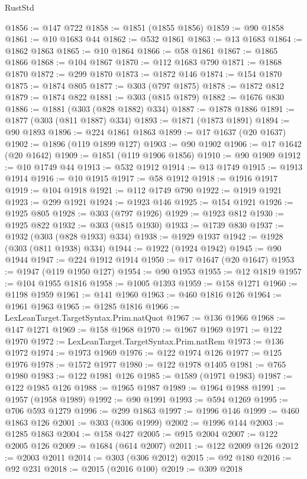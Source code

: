 \begin{lexlean}{RustStd}
\begin{coremodule}
{\begin{coremodule}
{{{{{{{{{{{{{{{{{{{{{{{{{{{{{{{{{{{{{{{{{{{{{{{{{{{{{{{{{{{{{{{{{{{{@1856 := @147 @722
@1858 := @1851 (@1855 @1856)
@1859 := @90 @1858
@1861 := @10 @1683 @44
@1862 := @532 @1861
@1863 := @13 @1683
@1864 := @1862 @1863
@1865 := @10 @1864
@1866 := @58 @1861
@1867 := @1865 @1866
@1868 := @104 @1867
@1870 := @112 @1683 @790
@1871 := @1868 @1870
@1872 := @299 @1870
@1873 := @1872 @146
@1874 := @154 @1870
@1875 := @1874 @805
@1877 := @303 (@797 @1875)
@1878 := @1872 @812
@1879 := @1874 @822
@1881 := @303 (@815 @1879)
@1882 := @1676 @830
@1886 := @1881 (@303 (@828 @1882) @334)
@1887 := @1878 @1886
@1891 := @1877 (@303 (@811 @1887) @334)
@1893 := @1871 (@1873 @1891)
@1894 := @90 @1893
@1896 := @224 @1861 @1863
@1899 := @17 @1637 (@20 @1637)
@1902 := @1896 (@119 @1899 @127)
@1903 := @90 @1902
@1906 := @17 @1642 (@20 @1642)
@1909 := @1851 (@119 @1906 @1856)
@1910 := @90 @1909
@1912 := @10 @1749 @44
@1913 := @532 @1912
@1914 := @13 @1749
@1915 := @1913 @1914
@1916 := @10 @1915
@1917 := @58 @1912
@1918 := @1916 @1917
@1919 := @104 @1918
@1921 := @112 @1749 @790
@1922 := @1919 @1921
@1923 := @299 @1921
@1924 := @1923 @146
@1925 := @154 @1921
@1926 := @1925 @805
@1928 := @303 (@797 @1926)
@1929 := @1923 @812
@1930 := @1925 @822
@1932 := @303 (@815 @1930)
@1933 := @1739 @830
@1937 := @1932 (@303 (@828 @1933) @334)
@1938 := @1929 @1937
@1942 := @1928 (@303 (@811 @1938) @334)
@1944 := @1922 (@1924 @1942)
@1945 := @90 @1944
@1947 := @224 @1912 @1914
@1950 := @17 @1647 (@20 @1647)
@1953 := @1947 (@119 @1950 @127)
@1954 := @90 @1953
@1955 := @12 @1819
@1957 := @104 @1955 @1816
@1958 := @1005 @1393
@1959 := @158 @1271
@1960 := @1198 @1959
@1961 := @141 @1960
@1963 := @460 @1816 @126
@1964 := @1961 @1963
@1965 := @1285 @1816
@1966 := LexLeanTarget.TargetSyntax.Prim.natQuot
@1967 := @136 @1966
@1968 := @147 @1271
@1969 := @158 @1968
@1970 := @1967 @1969
@1971 := @122 @1970
@1972 := LexLeanTarget.TargetSyntax.Prim.natRem
@1973 := @136 @1972
@1974 := @1973 @1969
@1976 := @122 @1974 @126
@1977 := @125 @1976
@1978 := @1572 @1977
@1980 := @122 @1978 @1405
@1981 := @765 @1980
@1983 := @122 @1981 @126
@1985 := @1589 (@1971 @1983)
@1987 := @122 @1985 @126
@1988 := @1965 @1987
@1989 := @1964 @1988
@1991 := @1957 (@1958 @1989)
@1992 := @90 @1991
@1993 := @594 @1269
@1995 := @706 @593 @1279
@1996 := @299 @1863
@1997 := @1996 @146
@1999 := @460 @1863 @126
@2001 := @303 (@306 @1999)
@2002 := @1996 @144
@2003 := @1285 @1863
@2004 := @158 @427
@2005 := @915 @2004
@2007 := @122 @2005 @126
@2009 := @1684 (@614 @2007)
@2011 := @122 @2009 @126
@2012 := @2003 @2011
@2014 := @303 (@306 @2012)
@2015 := @92 @180
@2016 := @92 @231
@2018 := @2015 (@2016 @100)
@2019 := @309 @2018
}}}}}}}}}}}}}}}}}}}}}}}}}}}}}}}}}}}}}}}}}}}}}}}}}}}}}}}}}}}}}}}}}}}}
\end{coremodule}}
\end{coremodule}
\end{lexlean}
